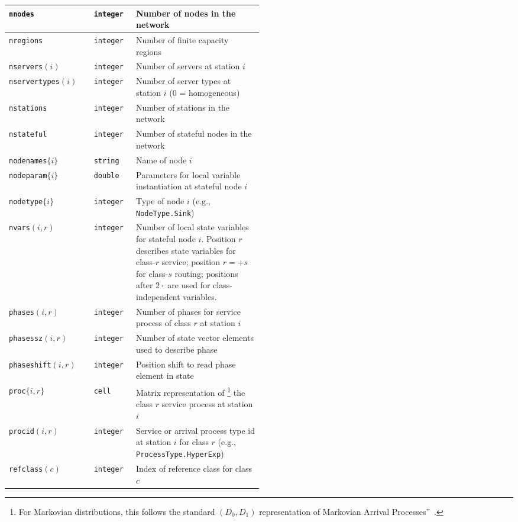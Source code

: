 \begin{MATLAB}
\begin{table}[thbp]
{\begin{tabular}{|l|l|p{0.5\linewidth}|}
\texttt{nnodes} & \texttt{integer} & Number of nodes in the network\\\hline
\texttt{nregions} & \texttt{integer} & Number of finite capacity regions\\\hline
\texttt{nservers}$(i)$ & \texttt{integer} & Number of servers at station $i$\\\hline
\texttt{nservertypes}$(i)$ & \texttt{integer} & Number of server types at station $i$ (0 = homogeneous)\\\hline
\texttt{nstations} & \texttt{integer} & Number of stations in the network\\\hline
\texttt{nstateful} & \texttt{integer} & Number of stateful nodes in the network\\\hline
\texttt{nodenames}$\{i\}$ & \texttt{string} & Name of node $i$\\\hline
\texttt{nodeparam}$\{i\}$  & \texttt{double} & Parameters for local variable instantiation at stateful node $i$\\\hline
\texttt{nodetype}$\{i\}$ & \texttt{integer} & Type of node $i$ (e.g., \texttt{NodeType.Sink})\\\hline
\texttt{nvars}$(i,r)$ & \texttt{integer} & Number of local state variables for stateful node $i$. Position $r$ describes state variables for class-$r$ service; position $r=$\text{\texttt{nclasses}}+$s$ for class-$s$ routing; positions after $2\cdot$\text{\texttt{nclasses}} are used for class-independent variables.\\\hline
\texttt{phases}$(i,r)$ & \texttt{integer} & Number of phases for service process of class $r$ at station $i$\\\hline
\texttt{phasessz}$(i,r)$ & \texttt{integer} & Number of state vector elements used to describe phase\\\hline
\texttt{phaseshift}$(i,r)$ & \texttt{integer} & Position shift to read phase element in state\\\hline
\texttt{proc}$\{i,r\}$ & \texttt{cell} & Matrix representation of \footnote{For Markovian distributions, this follows the standard $(D_0,D_1)$ representation of Markovian Arrival Processes''~\cite[\S 6.8.3]{BolGMT06}.} the class $r$ service process at station $i$\\\hline
\texttt{procid}$(i,r)$ & \texttt{integer} & Service or arrival process type id at station $i$ for class $r$ (e.g., \texttt{ProcessType.HyperExp})\\\hline
\texttt{refclass}$(c)$ & \texttt{integer} & Index of reference class for class $c$ \\\hline

\end{tabular}}
\end{table}
\end{MATLAB}
